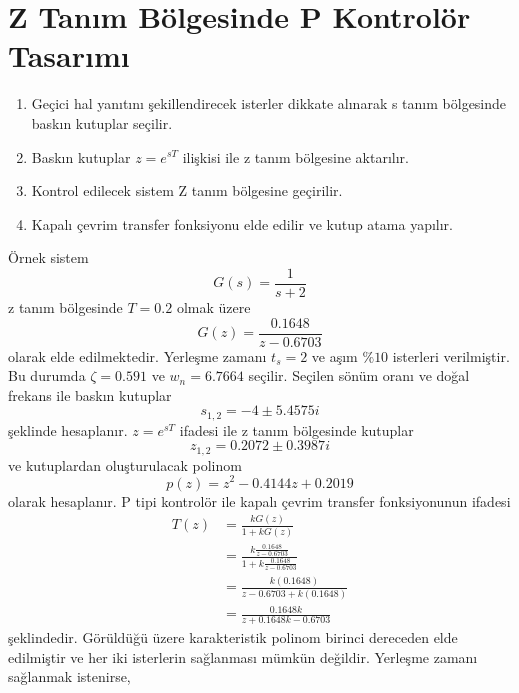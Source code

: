 \chapter{Z Tanım Bölgesinde P Kontrolör Tasarımı}
\begin{enumerate}
    \item Geçici hal yanıtını şekillendirecek isterler dikkate alınarak s tanım bölgesinde baskın kutuplar seçilir. 
    \item Baskın kutuplar $z=e^{sT}$ ilişkisi ile z tanım bölgesine aktarılır. 
    \item Kontrol edilecek sistem Z tanım bölgesine geçirilir. 
    \item Kapalı çevrim transfer fonksiyonu elde edilir ve kutup atama yapılır.
\end{enumerate}
Örnek sistem
\begin{equation}
    G(s)=\frac{1}{s+2}
\end{equation}
z tanım bölgesinde $T=0.2$ olmak üzere
\begin{equation}
    G(z)=\frac{0.1648}{z-0.6703}
\end{equation}
olarak elde edilmektedir. Yerleşme zamanı $t_s=2$ ve aşım $\%10$ isterleri verilmiştir. Bu durumda $\zeta=0.591$ ve $w_n=6.7664$ seçilir. Seçilen sönüm oranı ve doğal frekans ile baskın kutuplar
\begin{equation}
    s_{1,2}=-4 \pm 5.4575i
\end{equation}
şeklinde hesaplanır. $z=e^{sT}$ ifadesi ile z tanım bölgesinde kutuplar
\begin{equation}
    z_{1,2}=0.2072 \pm 0.3987i
\end{equation}
ve kutuplardan oluşturulacak polinom
\begin{equation}
    p(z)=z^2-0.4144 z+0.2019
\end{equation}
olarak hesaplanır. P tipi kontrolör ile kapalı çevrim transfer fonksiyonunun ifadesi
\begin{equation}
\begin{split}
    T(z)&=\frac{kG(z)}{1+kG(z)}\\
    &=\frac{k\frac{0.1648}{z-0.6703}}{1+k\frac{0.1648}{z-0.6703}}\\
    &=\frac{k(0.1648)}{z-0.6703+k(0.1648)}\\
    &=\frac{0.1648k}{z+0.1648k-0.6703}
\end{split}
\end{equation}
şeklindedir. Görüldüğü üzere karakteristik polinom birinci dereceden elde edilmiştir ve her iki isterlerin sağlanması mümkün değildir. Yerleşme zamanı sağlanmak istenirse,
